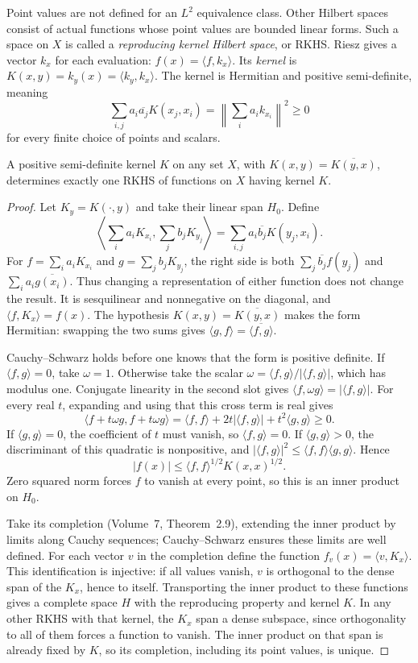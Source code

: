 Point values are not defined for an $L^2$ equivalence class. Other Hilbert spaces consist of actual functions whose point values are bounded linear forms. Such a space on $X$ is called a \emph{reproducing kernel Hilbert space}, or RKHS. Riesz gives a vector $k_x$ for each evaluation: $f(x)=\langle f,k_x\rangle$. Its \emph{kernel} is $K(x,y)=k_y(x)=\langle k_y,k_x\rangle$. The kernel is Hermitian and positive semi-definite, meaning
\[\sum_{i,j}a_i\overline{a_j}K(x_j,x_i)=\left\|\sum_ia_ik_{x_i}\right\|^2\ge0\]
for every finite choice of points and scalars.

\begin{theorem}\label{thm:aronszajn}
A positive semi-definite kernel $K$ on any set $X$, with $K(x,y)=\overline{K(y,x)}$, determines exactly one RKHS of functions on $X$ having kernel $K$.
\end{theorem}
\begin{proof}
Let $K_y=K(\cdot,y)$ and take their linear span $H_0$. Define
\[\left\langle\sum_ia_iK_{x_i},\sum_jb_jK_{y_j}\right\rangle=\sum_{i,j}a_i\overline{b_j}K(y_j,x_i).\]
For $f=\sum_ia_iK_{x_i}$ and $g=\sum_jb_jK_{y_j}$, the right side is both $\sum_j\overline{b_j}f(y_j)$ and $\sum_ia_i\overline{g(x_i)}$. Thus changing a representation of either function does not change the result. It is sesquilinear and nonnegative on the diagonal, and $\langle f,K_x\rangle=f(x)$. The hypothesis $K(x,y)=\overline{K(y,x)}$ makes the form Hermitian: swapping the two sums gives $\langle g,f\rangle=\overline{\langle f,g\rangle}$.

Cauchy--Schwarz holds before one knows that the form is positive definite. If $\langle f,g\rangle=0$, take $\omega=1$. Otherwise take the scalar $\omega=\langle f,g\rangle/|\langle f,g\rangle|$, which has modulus one. Conjugate linearity in the second slot gives $\langle f,\omega g\rangle=|\langle f,g\rangle|$. For every real $t$, expanding and using that this cross term is real gives
\[
\langle f+t\omega g,f+t\omega g\rangle=\langle f,f\rangle+2t|\langle f,g\rangle|+t^2\langle g,g\rangle\ge0.
\]
If $\langle g,g\rangle=0$, the coefficient of $t$ must vanish, so $\langle f,g\rangle=0$. If $\langle g,g\rangle>0$, the discriminant of this quadratic is nonpositive, and $|\langle f,g\rangle|^2\le\langle f,f\rangle\langle g,g\rangle$. Hence
\[|f(x)|\le\langle f,f\rangle^{1/2}K(x,x)^{1/2}.\]
Zero squared norm forces $f$ to vanish at every point, so this is an inner product on $H_0$.

Take its completion (Volume~7, Theorem~2.9), extending the inner product by limits along Cauchy sequences; Cauchy--Schwarz ensures these limits are well defined. For each vector $v$ in the completion define the function $f_v(x)=\langle v,K_x\rangle$. This identification is injective: if all values vanish, $v$ is orthogonal to the dense span of the $K_x$, hence to itself. Transporting the inner product to these functions gives a complete space $H$ with the reproducing property and kernel $K$. In any other RKHS with that kernel, the $K_x$ span a dense subspace, since orthogonality to all of them forces a function to vanish. The inner product on that span is already fixed by $K$, so its completion, including its point values, is unique.
\end{proof}

